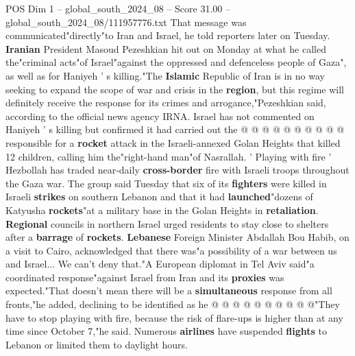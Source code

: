\begin{textsample}{POS Dim 1 – global\_south\_2024\_08 – Score 31.00 – global\_south\_2024\_08/111957776.txt}
That message was communicated"directly"to Iran and Israel, he told reporters later on Tuesday. \textbf{Iranian} President Masoud Pezeshkian hit out on Monday at what he called the"criminal acts"of Israel"against the oppressed and defenceless people of Gaza", as well as for Haniyeh ' s killing."The \textbf{Islamic} Republic of Iran is in no way seeking to expand the scope of war and crisis in the \textbf{region}, but this regime will definitely receive the response for its crimes and arrogance,"Pezeshkian said, according to the official news agency IRNA.
Israel has not commented on Haniyeh ' s killing but confirmed it had carried out the @ @ @ @ @ @ @ @ @ @ responsible for a \textbf{rocket} attack in the Israeli-annexed Golan Heights that killed 12 children, calling him the"right-hand man"of Nasrallah. ' Playing with fire ' Hezbollah has traded near-daily \textbf{cross-border} fire with Israeli troops throughout the Gaza war.
The group said Tuesday that six of its \textbf{fighters} were killed in Israeli \textbf{strikes} on southern Lebanon and that it had \textbf{launched}"dozens of Katyusha \textbf{rockets}"at a military base in the Golan Heights in \textbf{retaliation}. \textbf{Regional} councils in northern Israel urged residents to stay close to shelters after a \textbf{barrage} of \textbf{rockets}. \textbf{Lebanese} Foreign Minister Abdallah Bou Habib, on a visit to Cairo, acknowledged that there was"a possibility of a war between us and Israel...
We can't deny that."A European diplomat in Tel Aviv said"a coordinated response"against Israel from Iran and its \textbf{proxies} was expected."That doesn't mean there will be a \textbf{simultaneous} response from all fronts,"he added, declining to be identified as he @ @ @ @ @ @ @ @ @ @"They have to stop playing with fire, because the risk of flare-ups is higher than at any time since October 7,"he said.
Numerous \textbf{airlines} have suspended \textbf{flights} to Lebanon or limited them to daylight hours.

\end{textsample}
